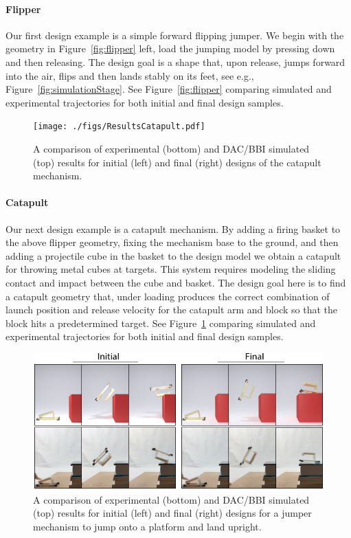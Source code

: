 \paragraph{Flipper}
Our first design example is a simple forward flipping jumper. We begin with the geometry in Figure~\ref{fig:flipper} left, load the jumping model by pressing down and then releasing. The design goal is a shape that, upon release, jumps forward into the air, flips and then lands stably on its feet, see e.g., Figure~\ref{fig:simulationStage}. 
See Figure~\ref{fig:flipper} comparing simulated and experimental trajectories for both initial and final design samples.

\begin{figure}[h!]
\texttt{[image: ./figs/ResultsCatapult.pdf]}
\caption{A comparison of experimental (bottom) and DAC/BBI simulated (top) results for initial (left) and final (right) designs of the catapult mechanism.}
\label{fig:catapult}	
\end{figure}

\paragraph{Catapult}
Our next design example is a catapult mechanism. By adding a firing basket to the above flipper geometry, fixing the mechanism base to the ground, and then adding a projectile cube in the basket to the design model we obtain a catapult for throwing metal cubes at targets. This system requires modeling the sliding contact and impact between the cube and basket. The design goal here is to find a catapult geometry that, under loading produces the correct combination of launch position and release velocity for the catapult arm and block so that the block hits a predetermined target. 
See Figure~\ref{fig:catapult} comparing simulated and experimental trajectories for both initial and final design samples.

\begin{figure}[h!]
\includegraphics[width=\columnwidth]{./figs/ResultsOnto.pdf}
\caption{A comparison of experimental (bottom) and DAC/BBI simulated (top) results for initial (left) and final (right) designs for a jumper mechanism to jump onto a platform and land upright.}
\label{fig:onto}	
\end{figure}

